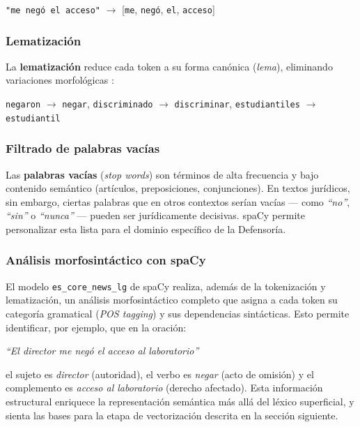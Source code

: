 \begin{center}
  \texttt{"me negó el acceso"} $\longrightarrow$
  [\texttt{me}, \texttt{negó}, \texttt{el}, \texttt{acceso}]
\end{center}

\subsubsection*{Lematización}

La \textbf{lematización} reduce cada token a su forma canónica (\textit{lema}),
eliminando variaciones morfológicas \cite{jurafsky2023}:

\begin{center}
  \texttt{negaron} $\to$ \texttt{negar}, \quad
  \texttt{discriminado} $\to$ \texttt{discriminar}, \quad
  \texttt{estudiantiles} $\to$ \texttt{estudiantil}
\end{center}

\subsubsection*{Filtrado de palabras vacías}

Las \textbf{palabras vacías} (\textit{stop words}) son términos de alta
frecuencia y bajo contenido semántico (artículos, preposiciones, conjunciones).
En textos jurídicos, sin embargo, ciertas palabras que en otros contextos serían
vacías — como \textit{``no''}, \textit{``sin''} o \textit{``nunca''} — pueden
ser jurídicamente decisivas. spaCy permite personalizar esta lista para el
dominio específico de la Defensoría.

\subsubsection*{Análisis morfosintáctico con spaCy}

El modelo \texttt{es\_core\_news\_lg} de spaCy realiza, además de la
tokenización y lematización, un análisis morfosintáctico completo que asigna a
cada token su categoría gramatical (\textit{POS tagging}) y sus dependencias
sintácticas. Esto permite identificar, por ejemplo, que en la oración:

\begin{center}
  \textit{``El director me negó el acceso al laboratorio''}
\end{center}

\noindent el sujeto es \textit{director} (autoridad), el verbo es \textit{negar}
(acto de omisión) y el complemento es \textit{acceso al laboratorio} (derecho
afectado). Esta información estructural enriquece la representación semántica
más allá del léxico superficial, y sienta las bases para la etapa de
vectorización descrita en la sección siguiente.

